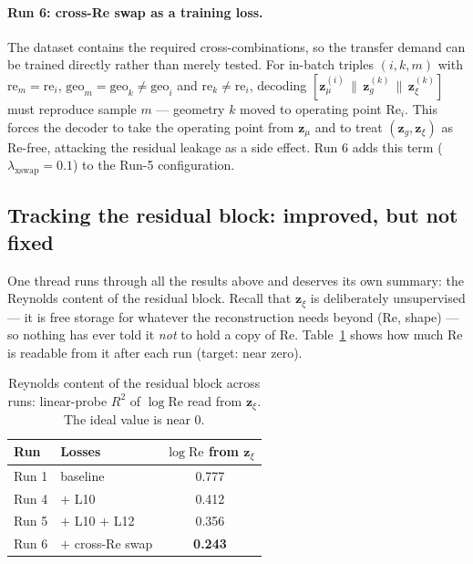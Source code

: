 \documentclass[11pt]{article}
\begin{document}
\paragraph{Run 6: cross-Re swap as a training loss.} The dataset contains
the required cross-combinations, so the transfer demand can be trained
directly rather than merely tested. For in-batch triples $(i, k, m)$ with
$\mathrm{re}_m = \mathrm{re}_i$, $\mathrm{geo}_m = \mathrm{geo}_k \ne
\mathrm{geo}_i$ and $\mathrm{re}_k \ne \mathrm{re}_i$, decoding
$[\boldsymbol{z}_{\mu}^{(i)} \,\|\, \boldsymbol{z}_{g}^{(k)} \,\|\,
\boldsymbol{z}_{\xi}^{(k)}]$ must reproduce sample $m$ --- geometry $k$
moved to operating point $\mathrm{Re}_i$. This forces the decoder to take
the operating point from $\boldsymbol{z}_{\mu}$ and to treat
$(\boldsymbol{z}_{g}, \boldsymbol{z}_{\xi})$ as Re-free, attacking the
residual leakage as a side effect. Run 6 adds this term
($\lambda_{\mathrm{xswap}} = 0.1$) to the Run-5 configuration.

\subsection{Tracking the residual block: improved, but not fixed}

One thread runs through all the results above and deserves its own
summary: the Reynolds content of the residual block. Recall that
$\boldsymbol{z}_{\xi}$ is deliberately unsupervised --- it is free
storage for whatever the reconstruction needs beyond (Re, shape) --- so
nothing has ever told it \emph{not} to hold a copy of Re.
Table~\ref{tab:resid} shows how much Re is readable from it after each
run (target: near zero).

\begin{table}[htbp]
  \centering
  \caption{Reynolds content of the residual block across runs:
  linear-probe $R^2$ of $\log \mathrm{Re}$ read from
  $\boldsymbol{z}_{\xi}$. The ideal value is near $0$.}
  \label{tab:resid}
  \begin{tabular}{llc}
    \toprule
    Run & Losses & $\log \mathrm{Re}$ from $\boldsymbol{z}_{\xi}$ \\
    \midrule
    Run 1 & baseline            & 0.777 \\
    Run 4 & $+$ L10             & 0.412 \\
    Run 5 & $+$ L10 $+$ L12     & 0.356 \\
    Run 6 & $+$ cross-Re swap   & \textbf{0.243} \\
    \bottomrule
  \end{tabular}
\end{table}
\end{document}
